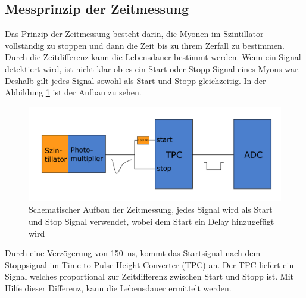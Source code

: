 \documentclass[12pt,a4paper,ngerman]{report}
\begin{document}
	\subsection{Messprinzip der Zeitmessung}
	Das Prinzip der Zeitmessung besteht darin, die Myonen im Szintillator vollständig zu stoppen und dann die Zeit bis zu ihrem Zerfall zu bestimmen. Durch die Zeitdifferenz kann die Lebensdauer bestimmt werden. Wenn ein Signal detektiert wird, ist nicht klar ob es ein Start oder Stopp Signal eines Myons war. Deshalb gilt jedes Signal sowohl als Start und Stopp gleichzeitig. In der Abbildung \ref{img:ZeitEinfach} ist der Aufbau zu sehen.
	\begin{figure}[ht]
		\centering
		\includegraphics[width=\textwidth]{Bilder/ZeitmessungEinfach.pdf}		
		\caption[Schematischer Aufbau der Zeitmessung]{Schematischer Aufbau der Zeitmessung, jedes Signal wird als Start und Stop Signal verwendet, wobei dem Start ein Delay hinzugefügt wird }
		\label{img:ZeitEinfach}
	\end{figure}
	Durch eine Verzögerung von \SI{150}{\nano \second}, kommt das Startsignal nach dem Stoppsignal im Time to Pulse Height Converter (TPC) an. Der TPC liefert ein Signal welches proportional zur Zeitdifferenz zwischen Start und Stopp ist. Mit Hilfe dieser Differenz, kann die Lebensdauer ermittelt werden.\\
\end{document}
